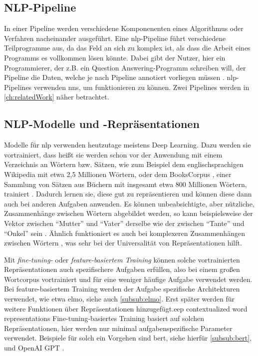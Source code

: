\subsection{NLP-Pipeline}

In einer Pipeline werden verschiedene Komponenenten eines Algorithmus oder Verfahren nacheinander ausgeführt.
Eine \ac{nlp}-Pipeline führt verschiedene Teilprogramme aus, da das Feld an sich zu komplex ist, als dass die Arbeit eines Programms es vollkommen lösen könnte.
Dabei gibt der Nutzer, hier ein Programmierer, der z.B. ein Question Answering-Programm schreiben will, der Pipeline die Daten, welche je nach Pipeline annotiert vorliegen müssen \citep{curatorpipeline}.
\ac{nlp}-Pipelines verwenden \acp{nn}, um funktionieren zu können.
Zwei Pipelines werden in \cref{ch:relatedWork} näher betrachtet.

\subsection{NLP-Modelle und -Repräsentationen}

Modelle für \acl{nlp} verwenden heutzutage meistens Deep Learning.
Dazu werden sie vortrainiert, dass heißt sie werden schon vor der Anwendung mit einem Verzeichnis an Wörtern bzw. Sätzen,
wie zum Beispiel dem englischsprachigen Wikipedia mit etwa 2,5 Millionen Wörtern,
oder dem BooksCorpus \citep{bookscorpus},
einer Sammlung von Sätzen aus Büchern mit insgesamt etwa 800 Millionen Wörtern,
trainiert \citep{bert}.
Dadurch lernen sie, diese gut zu repräsentieren und können diese dann auch bei anderen Aufgaben anwenden.
Es können unbeabsichtigte, aber nützliche, Zusammenhänge zwischen Wörtern abgebildet werden,
so kann beispielsweise der Vektor zwischen \enquote{Mutter} und \enquote{Vater} derselbe wie der zwischen \enquote{Tante} und \enquote{Onkel} sein \citep{mikolov2013a}.
Ähnlich funktioniert es auch bei komplexeren Zusammenhängen zwischen Wörtern \citep{mikolov2013b}, was sehr bei der Universalität von Repräsentationen hilft.

Mit \emph{fine-tuning-} oder \emph{feature-basiertem Training} können solche vortrainierten Repräsentationen auch spezifischere Aufgaben erfüllen,
also bei einem großen Wortcorpus vortrainiert und für eine weniger häufige Aufgabe verwendet werden.
Bei feature-basiertem Training werden der Aufgabe spezifische Architekturen verwendet, wie etwa \acs{elmo}, siehe auch \cref{subsub:elmo}.
Erst später werden für weitere Funktionen über Repräsentationen hinzugefügt.eep contextualized word representations
Fine-tuning-basiertes Training basiert auf solchen Repräsentationen, hier werden nur minimal aufgabenspezifische Parameter verwendet.
Beispiele für solch ein Vorgehen sind \acs{bert}, siehe hierfür \cref{subsub:bert}, und OpenAI GPT \citep{openaigpt}.

